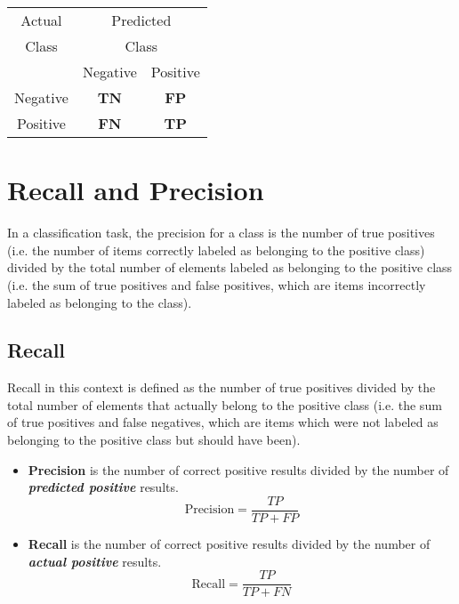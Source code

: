 \documentclass[a4paper,12pt]{article}
\begin{document}
	
	
	{

		\centering
		\begin{table}[!htbp]
			
			\begin{tabular}{|c | *2c |}
				Actual  & \multicolumn{2}{c}{Predicted}\\
				Class  & \multicolumn{2}{c}{Class}\\

				{}   & Negative & Positive       \\
				Negative  &  \textbf{TN} & \textbf{FP}  \\
				Positive   &  \textbf{FN} & \textbf{TP}  \\
				\hline
			\end{tabular}
		\end{table}
	}

\section{Recall and Precision}
In a classification task, the precision for a class is the number of true positives (i.e. the number of items correctly labeled as belonging to the positive class) divided by the total number of elements labeled as belonging to the positive class (i.e. the sum of true positives and false positives, which are items incorrectly labeled as belonging to the class). 


\subsection*{Recall}
Recall in this context is defined as the number of true positives divided by the total number of elements that actually belong to the positive class (i.e. the sum of true positives and false negatives, which are items which were not labeled as belonging to the positive class but should have been).
\begin{itemize}
	\item \textbf{Precision} is the number of correct positive results divided by the number of \textit{\textbf{predicted positive}} results.
	\[ \mbox{Precision}= \frac{TP}{TP+FP}  \]
	\item \textbf{Recall} is the number of correct positive results divided by the number of \textit{\textbf{actual positive}} results. 
	\[ \mbox{Recall}= \frac{TP}{TP+FN}  \]
\end{itemize}
\end{document}
